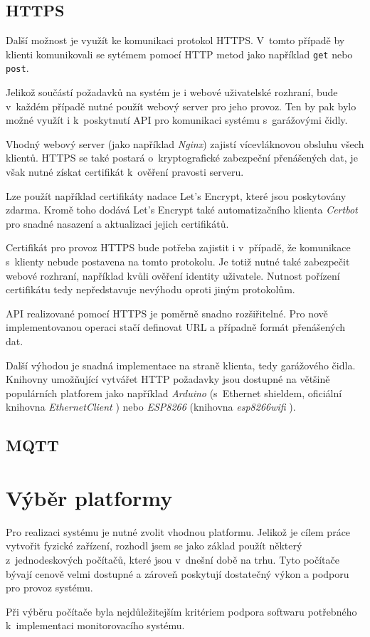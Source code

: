 \subsection{HTTPS}

Další možnost je využít ke komunikaci protokol HTTPS. V~tomto případě by klienti komunikovali se sytémem pomocí HTTP metod jako například \verb|get| nebo \verb|post|.

Jelikož součástí požadavků na systém je i webové uživatelské rozhraní, bude v~každém případě nutné použít webový server pro jeho provoz. Ten by pak bylo možné využít i k~poskytnutí API pro komunikaci systému s~garážovými čidly.

Vhodný webový server (jako například \textit{Nginx}) zajistí vícevláknovou obsluhu všech klientů. HTTPS se také postará o~kryptografické zabezpeční přenášených dat, je však nutné získat certifikát k~ověření pravosti serveru. 

Lze použít například certifikáty nadace Let's Encrypt, které jsou poskytovány  zdarma. Kromě toho dodává Let's Encrypt také automatizačního klienta \textit{Certbot} \cite{certbot} pro snadné nasazení a aktualizaci jejich certifikátů.

Certifikát pro provoz HTTPS bude potřeba zajistit i v~případě, že komunikace s~klienty nebude postavena na tomto protokolu. Je totiž nutné také zabezpečit webové rozhraní, například kvůli ověření identity uživatele. Nutnost pořízení certifikátu tedy nepředstavuje nevýhodu oproti jiným protokolům.

API realizované pomocí HTTPS je poměrně snadno rozšiřitelné. Pro nově implementovanou operaci stačí definovat URL a případně formát přenášených dat.

Další výhodou je snadná implementace na straně klienta, tedy garážového čidla. Knihovny umožňující vytvářet HTTP požadavky jsou dostupné na většině populárních platforem jako například \textit{Arduino} (s~Ethernet shieldem, oficiální knihovna \textit{EthernetClient} \cite{ard_web}) nebo \textit{ESP8266} (knihovna \textit{esp8266wifi} \cite{esp_web}).

\subsection{MQTT}

\cite{mqtt_valerie}

\section{Výběr platformy}

Pro realizaci systému je nutné zvolit vhodnou platformu. Jelikož je cílem práce vytvořit fyzické zařízení, rozhodl jsem se jako základ použít některý z~jednodeskových počítačů, které jsou v~dnešní době na trhu. Tyto počítače bývají cenově velmi dostupné a zároveň poskytují dostatečný výkon a podporu pro provoz systému.

Při výběru počítače byla nejdůležitejším kritériem podpora softwaru potřebného k~implementaci monitorovacího systému.